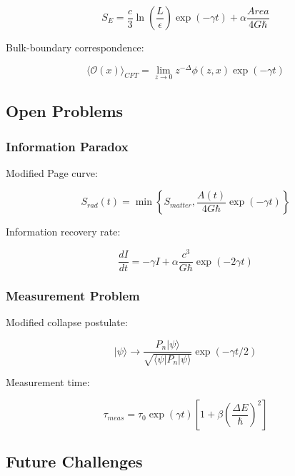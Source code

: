 \documentclass[12pt]{article}
\theoremstyle{plain}
\theoremstyle{definition}
\theoremstyle{remark}
\begin{document}
\begin{equation}
S_E = \frac{c}{3}\ln\left(\frac{L}{\epsilon}\right)\exp(-\gamma t) + \alpha\frac{Area}{4G\hbar}
\end{equation}

Bulk-boundary correspondence:

\begin{equation}
\langle\mathcal{O}(x)\rangle_{CFT} = \lim_{z\to 0}z^{-\Delta}\phi(z,x)\exp(-\gamma t)
\end{equation}

\subsection{Open Problems}

\subsubsection{Information Paradox}

Modified Page curve:

\begin{equation}
S_{rad}(t) = \min\left\{S_{matter}, \frac{A(t)}{4G\hbar}\exp(-\gamma t)\right\}
\end{equation}

Information recovery rate:

\begin{equation}
\frac{dI}{dt} = -\gamma I + \alpha\frac{c^3}{G\hbar}\exp(-2\gamma t)
\end{equation}

\subsubsection{Measurement Problem}

Modified collapse postulate:

\begin{equation}
|\psi\rangle \to \frac{P_n|\psi\rangle}{\sqrt{\langle\psi|P_n|\psi\rangle}}\exp(-\gamma t/2)
\end{equation}

Measurement time:

\begin{equation}
\tau_{meas} = \tau_0\exp(\gamma t)\left[1 + \beta\left(\frac{\Delta E}{\hbar}\right)^2\right]
\end{equation}

\subsection{Future Challenges}
\end{document}
